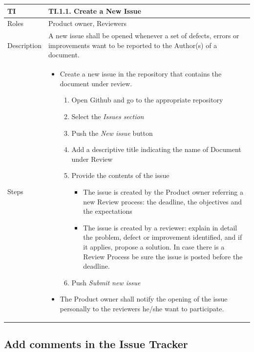 \documentclass{template/openetcs_article}
\begin{document}
\begin{flushleft}
\tablefirsthead{}
\tablehead{}
\tabletail{}
\tablelasttail{}
\begin{supertabular}{|m{2cm}|m{13cm}|}
\hline
{}
TI & 
TI.1.1. Create a New Issue
\\\hline
Roles &
Product owner, Reviewers
\\\hline
Description &
A new issue shall be opened whenever a set of defects, errors or improvements want to be reported to the Author(s) of a document.
\\\hline
Steps &
\begin{itemize}
\item Create a new issue in the repository that contains the document under review. 
\begin{enumerate}
\item Open Github and go to the appropriate repository
\item Select the {\it Issues section}
\item Push the {\it New issue} button
\item Add a descriptive title indicating the name of Document under Review
\item Provide the contents of the issue
\begin{itemize}
\item The issue is created by the Product owner referring a new Review process: the deadline, the objectives and the expectations
\item The issue is created by a reviewer: explain in detail the problem, defect or improvement identified, and if it applies, propose a solution. In case there is a Review Process be sure the issue is posted before the deadline.
\end{itemize}
\item Push {\it Submit new issue}
\end{enumerate}
\item The Product owner shall notify the opening of the issue personally to the reviewers he/she want to participate. 
\end{itemize}
\\\hline
\end{supertabular}
\end{flushleft}


\subsection{Add comments in the Issue Tracker}
\end{document}

